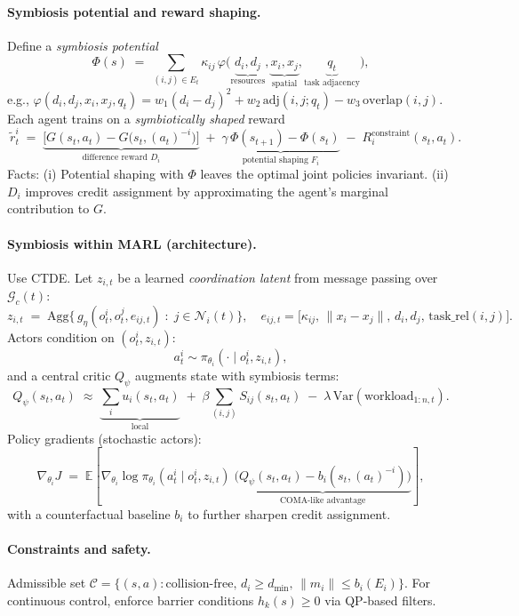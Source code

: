 \paragraph{Symbiosis potential and reward shaping.}
Define a \emph{symbiosis potential}
\[
\Phi(s)\;=\;\sum_{(i,j)\in E_t} \kappa_{ij}\,\varphi\!\big(\underbrace{d_i,d_j}_{\text{resources}},
\underbrace{x_i,x_j}_{\text{spatial}}, \underbrace{q_t}_{\text{task adjacency}}\big),
\]
e.g., $\varphi(d_i,d_j,x_i,x_j,q_t)=w_1(d_i\!-\!d_j)^2+w_2\,\text{adj}(i,j;q_t)-w_3\,\text{overlap}(i,j)$.
Each agent trains on a \emph{symbiotically shaped} reward
\[
\boxed{~\tilde r_t^i \;=\; \underbrace{\big[G(s_t,a_t)-G\!\big(s_t,(a_t)^{-i}\big)\big]}_{\text{difference reward }D_i}
\;+\;\underbrace{\gamma\,\Phi(s_{t+1})-\Phi(s_t)}_{\text{potential shaping }F_i}
\;-\;R^{\text{constraint}}_i(s_t,a_t).~}
\]
Facts: (i) Potential shaping with $\Phi$ leaves the optimal joint policies invariant. (ii) $D_i$ improves credit assignment by approximating the agent’s marginal contribution to $G$.

\paragraph{Symbiosis within MARL (architecture).}
Use CTDE. Let $z_{i,t}$ be a learned \emph{coordination latent} from message passing over $\mathcal{G}_c(t)$:
\[
z_{i,t} \;=\; \mathrm{Agg}\big\{\,g_\eta(o_t^i,o_t^j,e_{ij,t}) \;:\; j\in\mathcal{N}_i(t)\big\},
\quad e_{ij,t}=\big[\kappa_{ij},\,\|x_i\!-\!x_j\|,\,d_i,d_j,\,\text{task\_rel}(i,j)\big].
\]
Actors condition on $(o_t^i,z_{i,t})$:
\[
a_t^i \sim \pi_{\theta_i}( \cdot \mid o_t^i, z_{i,t} ),
\]
and a central critic $Q_\psi$ augments state with symbiosis terms:
\[
Q_\psi(s_t,a_t) \;\approx\; \underbrace{\sum_i u_i(s_t,a_t)}_{\text{local}}
\;+\;\beta \sum_{(i,j)} S_{ij}(s_t,a_t)
\;-\;\lambda\,\mathrm{Var}(\text{workload}_{1:n,t}).
\]
Policy gradients (stochastic actors):
\[
\nabla_{\theta_i} J \;=\; \mathbb{E}\left[ \nabla_{\theta_i}\log \pi_{\theta_i}(a_t^i \mid o_t^i,z_{i,t})\;
\underbrace{\big( Q_\psi(s_t,a_t)-b_i(s_t,(a_t)^{-i})\big)}_{\text{COMA-like advantage}}\right],
\]
with a counterfactual baseline $b_i$ to further sharpen credit assignment.

\paragraph{Constraints and safety.}
Admissible set $\mathcal{C}=\{(s,a):\text{collision-free},\,d_i\ge d_{\min},\,\|m_i\|\le b_i(E_i)\}$.
For continuous control, enforce barrier conditions $h_k(s)\ge 0$ via QP-based filters.


